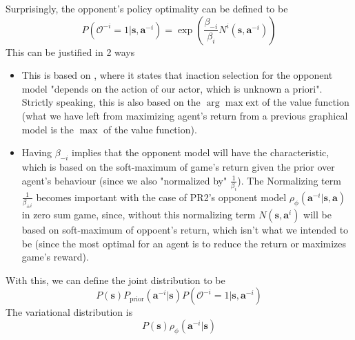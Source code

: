 Surprisingly, the opponent's policy optimality can be defined to be 
\begin{equation}
    P(\mathcal{O}^{-i} = 1 | \boldsymbol{s}, \boldsymbol{a}^{-i}) = \exp\left(\frac{\beta_{-i}}{\beta_{i}} N^{i}(\boldsymbol{s}, \boldsymbol{a}^{-i})\right)
\end{equation}
This can be justified in 2 ways 
\begin{itemize}
    \item This is based on \cite{grau2018balancing}, where it states that inaction selection for the opponent model  "depends on the action of our actor, which is unknown a priori". Strictly speaking, this is also based on the $\arg\max\text{ext}$ of the value function (what we have left from maximizing agent's return from a previous graphical model is the $\max$ of the value function). 
    \item Having $\beta_{-i}$ implies that the opponent model will have the characteristic, which is based on the soft-maximum of game's return given the prior over agent's behaviour (since we also "normalized by" $\frac{1}{\beta_i}$). 
    The Normalizing term $\frac{1}{\beta_{\pm i}}$ becomes important with the case of PR2's\cite{wen2019probabilistic} opponent model $\rho_{\phi}(\boldsymbol{a}^{-i} | \boldsymbol{s}, \boldsymbol{a})$ in zero sum game, since, without this normalizing term $N(\boldsymbol{s}, \boldsymbol{a}^{i})$ will be based on soft-maximum of oppoent's return, which isn't what we intended to be (since the most optimal for an agent is to reduce the return or maximizes game's reward).
\end{itemize}
With this, we can define the joint distribution to be 
\begin{equation}
    P(\boldsymbol{s}) P_{\text{prior}}(\boldsymbol{a}^{-i} | \boldsymbol{s}) P(\mathcal{O}^{-i} = 1 | \boldsymbol{s}, \boldsymbol{a}^{-i})
\end{equation}
The variational distribution is 
\begin{equation}
    P(\boldsymbol{s}) \rho_{\phi}(\boldsymbol{a}^{-i} | \boldsymbol{s})
\end{equation}


